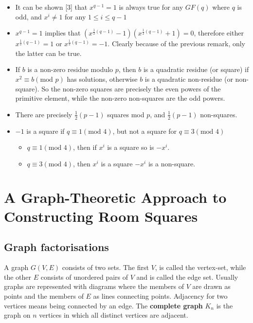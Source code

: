 \documentclass[
  12pt,
  a4paper]{book}
\begin{document}
\begin{itemize}
\item
  It can be shown {[}3{]} that \(x^{q-1}=1\) is always true for any
  \(GF(q)\) where \(q\) is odd, and \(x^i \neq 1\) for any
  \(1 \leq i \leq q-1\)
\item
  \(x^{q-1}=1\) implies that
  \((x^{\frac{1}{2}(q-1)}-1)(x^{\frac{1}{2}(q-1)}+1)=0\), therefore
  either \(x^{\frac{1}{2}(q-1)}=1\) or \(x^{\frac{1}{2}(q-1)}=-1\).
  Clearly because of the previous remark, only the latter can be true.
\item
  If \(b\) is a non-zero residue modulo \(p\), then \(b\) is a quadratic
  residue (or square) if \(x^2 \equiv b(\textrm{mod } p)\) has
  solutions, otherwise \(b\) is a quadratic non-residue (or non-square).
  So the non-zero squares are precisely the even powers of the primitive
  element, while the non-zero non-squares are the odd powers.
\item
  There are precisely \(\frac{1}{2}(p-1)\) squares mod \(p\), and
  \(\frac{1}{2}(p-1)\) non-squares.
\item
  \(-1\) is a square if \(q \equiv 1(\textrm{mod } 4)\), but not a
  square for \(q \equiv 3(\textrm{mod } 4)\)

  \begin{itemize}
  \item
    \(q \equiv 1(\textrm{mod } 4)\), then if \(x^i\) is a square so is
    \(-x^i\).
  \item
    \(q \equiv 3(\textrm{mod } 4)\), then \(x^i\) is a square \(-x^i\)
    is a non-square.
  \end{itemize}
\end{itemize}

\hypertarget{a-graph-theoretic-approach-to-constructing-room-squares}{%
\chapter{A Graph-Theoretic Approach to Constructing Room
Squares}\label{a-graph-theoretic-approach-to-constructing-room-squares}}

\hypertarget{graph-factorisations}{%
\section{Graph factorisations}\label{graph-factorisations}}

A graph \(G(V,E)\) consists of two sets. The first \(V\), is called the
vertex-set, while the other \(E\) consists of unordered pairs of \(V\)
and is called the edge set. Usually graphs are represented with diagrams
where the members of \(V\) are drawn as points and the members of \(E\)
as lines connecting points. Adjacency for two vertices means being
connected by an edge. The \textbf{complete graph} \(K_n\) is the graph
on \(n\) vertices in which all distinct vertices are adjacent.
\end{document}
